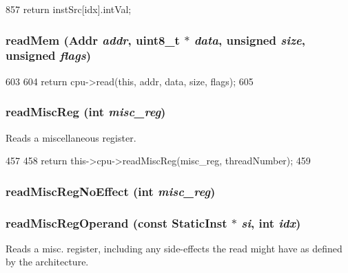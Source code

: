 \begin{DoxyCode}
857 { return instSrc[idx].intVal; }
\end{DoxyCode}
\hypertarget{classInOrderDynInst_a66191b2d8a45050b7df3c3efa7bb07c6}{
\subsubsection[{readMem}]{ readMem ({\bf Addr} {\em addr}, \/  uint8\_\-t $\ast$ {\em data}, \/  unsigned {\em size}, \/  unsigned {\em flags})}}
\label{classInOrderDynInst_a66191b2d8a45050b7df3c3efa7bb07c6}



\begin{DoxyCode}
603 {
604     return cpu->read(this, addr, data, size, flags);
605 }
\end{DoxyCode}
\hypertarget{classInOrderDynInst_a5a8c6c487e8da143d26188258b04f1cc}{
\subsubsection[{readMiscReg}]{ readMiscReg (int {\em misc\_\-reg})}}
\label{classInOrderDynInst_a5a8c6c487e8da143d26188258b04f1cc}
Reads a miscellaneous register. 


\begin{DoxyCode}
457 {
458     return this->cpu->readMiscReg(misc_reg, threadNumber);
459 }
\end{DoxyCode}
\hypertarget{classInOrderDynInst_a7b5ac6af9c2c19d7c1b442b8a3aebbc6}{
\subsubsection[{readMiscRegNoEffect}]{ readMiscRegNoEffect (int {\em misc\_\-reg})}}
\label{classInOrderDynInst_a7b5ac6af9c2c19d7c1b442b8a3aebbc6}
\hypertarget{classInOrderDynInst_ac6d0dc1a63cede82f4242d43236a98db}{
\subsubsection[{readMiscRegOperand}]{ readMiscRegOperand (const {\bf StaticInst} $\ast$ {\em si}, \/  int {\em idx})}}
\label{classInOrderDynInst_ac6d0dc1a63cede82f4242d43236a98db}
Reads a misc. register, including any side-\/effects the read might have as defined by the architecture. 


